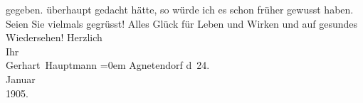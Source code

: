 \begin{ledgroupsized}[t]{13cm}
{{{                        gegeben.}}}\label{K_L01494_1h} überhaupt gedacht hätte, so würde ich es schon früher
                    gewusst haben. Seien Sie vielmals gegrüsst! Alles Glück für Leben und Wirken und
                    auf gesundes Wiedersehen!\pend
           \pstart
           Herzlich{\\[\baselineskip]} Ihr{\\[\baselineskip]}\spacefill\mbox{Gerhart Hauptmann}\pend
           \leftskip=0em{}\pstart
           \noindent{}{\pb}Agnetendorf\pend
           \pstart
           d 24.{\\}Januar{\\}1905.\pend
                     \endnumbering{}\end{ledgroupsized}  \newcommand{\dateiname}{L01494}\newcommand{\titel}{Gerhart Hauptmann an Arthur Schnitzler, 24. 1. 1905}\newcommand{\editorInnen}{Martin Anton Müller und Gerd-Hermann Susen}
            \footnotesize
\begin{ledgroupsized}[t]{11.5cm}
\end{ledgroupsized}
         
      